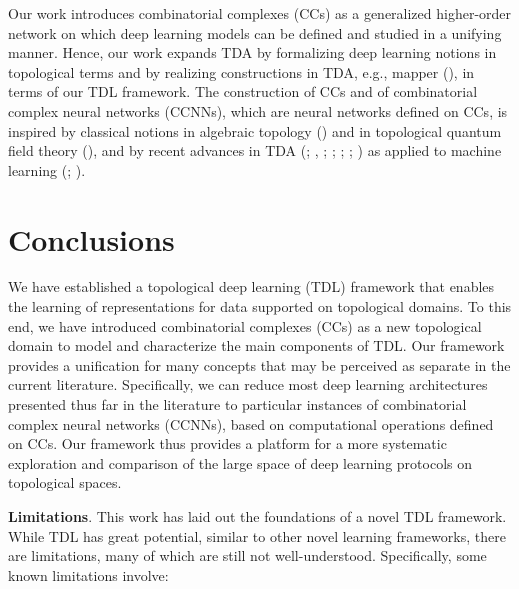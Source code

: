 \documentclass[
  12pt,
]{krantz}
\begin{document}
Our work introduces combinatorial complexes (CCs) as a generalized
higher-order network on which deep learning models can be defined and
studied in a unifying manner. Hence, our work expands TDA by formalizing
deep learning notions in topological terms and by realizing
constructions in TDA, e.g., mapper
(), in terms of
our TDL framework. The construction of CCs and of combinatorial complex
neural networks (CCNNs), which are neural networks defined on CCs, is
inspired by classical notions in algebraic topology
() and in topological
quantum field theory (),
and by recent advances in TDA (; , ;
; ; ; ) as applied
to machine learning (; ).

\section{Conclusions}\label{conclusions}

We have established a topological deep learning (TDL) framework that
enables the learning of representations for data supported on
topological domains. To this end, we have introduced combinatorial
complexes (CCs) as a new topological domain to model and characterize
the main components of TDL. Our framework provides a unification for
many concepts that may be perceived as separate in the current
literature. Specifically, we can reduce most deep learning architectures
presented thus far in the literature to particular instances of
combinatorial complex neural networks (CCNNs), based on computational
operations defined on CCs. Our framework thus provides a platform for a
more systematic exploration and comparison of the large space of deep
learning protocols on topological spaces.

\textbf{Limitations}. This work has laid out the foundations of a novel
TDL framework. While TDL has great potential, similar to other novel
learning frameworks, there are limitations, many of which are still not
well-understood. Specifically, some known limitations involve:
\end{document}
